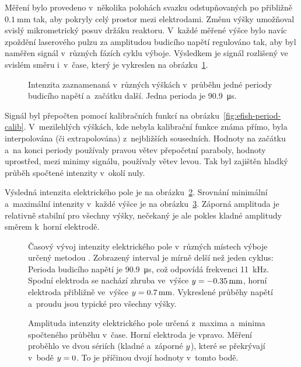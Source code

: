 Měření bylo provedeno v~několika polohách svazku
odstupňovaných po přibližně $\SI{0.1}{\milli\metre}$ tak,
aby pokryly celý prostor mezi elektrodami.
Změnu výšky umožňoval svislý mikrometrický posuv držáku reaktoru.
V~každé měřené výšce bylo navíc zpoždění laserového pulzu za amplitudou
budicího napětí regulováno tak,
aby byl naměřen signál v~různých fázích cyklu výboje.
Výsledkem je signál \EFISH{} rozlišený ve svislém směru i~v~čase,
který je vykreslen na obrázku~\ref{fig:efish-period-efish}.

\begin{figure}[htp]
	\centering
	
	\caption{Intenzita \EFISH{} zaznamenaná v~různých výškách
		v~průběhu jedné periody budicího napětí a~začátku další.
		Jedna perioda je \SI{90.9}{\micro\second}.}
	\label{fig:efish-period-efish}
\end{figure}

Signál byl přepočten pomocí kalibračních funkcí
na obrázku~\ref{fig:efish-period-calib}.
V~mezilehlých výškách, kde nebyla kalibrační funkce známa přímo,
byla interpolována (či extrapolována) z~nejbližších sousedních.
Hodnoty na začátku a~na konci periody používaly pravou větev
přepočetní paraboly,
hodnoty uprostřed, mezi minimy signálu, používaly větev levou.
Tak byl zajištěn hladký průběh spočtené intenzity v~okolí nuly.

Výsledná intenzita elektrického pole je na
obrázku~\ref{fig:efish-period-elfield}.
Srovnání minimální a~maximální intenzity v~každé výšce je
na obrázku~\ref{fig:efish-period-amplitude}.
Záporná amplituda je relativně stabilní pro všechny výšky,
nečekaný je ale pokles kladné amplitudy směrem k~horní elektrodě.

\begin{figure}[hbp]
	
	\caption{Časový vývoj intenzity elektrického pole v~různých místech výboje
		určený metodou \EFISH{}.
		Zobrazený interval je mírně delší než jeden cyklus:
		Perioda budicího napětí je \SI{90.9}{\micro\second},
		což odpovídá frekvenci \SI{11}{\kilo\hertz}.
		Spodní elektroda se nachází zhruba ve~výšce
		$y = \SI{-0.35}{\milli\metre}$,
		horní elektroda přibližně ve~výšce
		$y = \SI{0.7}{\milli\metre}$.
		Vykreslené průběhy napětí a~proudu jsou typické pro všechny výšky.}
	\label{fig:efish-period-elfield}
\end{figure}

\begin{figure}[htp]
	\centering
	
	\caption{Amplituda intenzity elektrického pole určená z~maxima
		a~minima spočteného průběhu v~čase.
		Horní elektroda je vpravo.
		Měření proběhlo ve dvou sériích (kladné a~záporné $y$),
		které se překrývají v~bodě $y = 0$.
		To je příčinou dvojí hodnoty v~tomto bodě.}
	\label{fig:efish-period-amplitude}
\end{figure}
